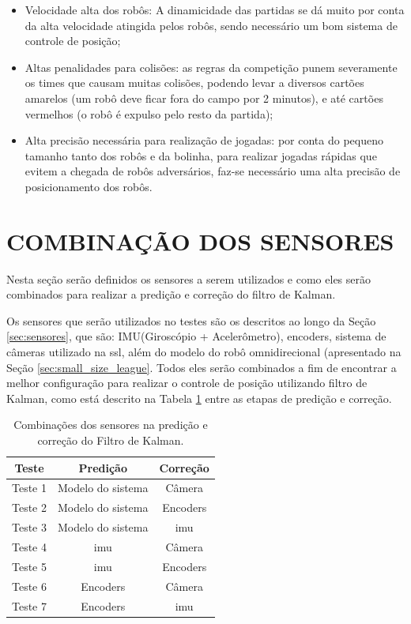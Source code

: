 \documentclass[acronym, symbols, table]{fei}
\begin{document}
		\begin{itemize}
			\item Velocidade alta dos robôs: A dinamicidade das partidas se dá muito por conta da alta velocidade atingida pelos robôs, sendo necessário um bom sistema de controle de posição;
			
			\item Altas penalidades para colisões: as regras da competição punem severamente os times que causam muitas colisões, podendo levar a diversos cartões amarelos (um robô deve ficar fora do campo por 2 minutos), e até cartões vermelhos (o robô é expulso pelo resto da partida);
			
			\item Alta precisão necessária para realização de jogadas: por conta do pequeno tamanho tanto dos robôs e da bolinha, para realizar jogadas rápidas que evitem a chegada de robôs adversários, faz-se necessário uma alta precisão de posicionamento dos robôs.
		\end{itemize}
		
	\section{COMBINAÇÃO DOS SENSORES}\label{sec_metodologia_comb_sensores}
	
		Nesta seção serão definidos os sensores a serem utilizados e como eles serão combinados para realizar a predição e correção do filtro de Kalman.
		
		Os sensores que serão utilizados no testes são os descritos ao longo da Seção \ref{sec:sensores}, que são: IMU(Giroscópio + Acelerômetro), encoders, sistema de câmeras utilizado na \acrshort{ssl}, além do modelo do robô omnidirecional (apresentado na Seção \ref{sec:small_size_league}. Todos eles serão combinados a fim de encontrar a melhor configuração para realizar o controle de posição utilizando filtro de Kalman, como está descrito na Tabela \ref{tbl:combinacao_sensores} entre as etapas de predição e correção.
		
		\begin{table}[!htb]
			\centering
			\caption{Combinações dos sensores na predição e correção do Filtro de Kalman.}
			\label{tbl:combinacao_sensores}
			\begin{tabular}{|c|c|c|}
				\hline
				\textbf{Teste}   & \textbf{Predição}   & \textbf{Correção} \\ \hline
				Teste 1 & Modelo do sistema & Câmera   \\ \hline
				Teste 2 & Modelo do sistema & Encoders \\ \hline
				Teste 3 & Modelo do sistema & \acrshort{imu} \\ \hline
				Teste 4 & \acrshort{imu}    & Câmera   \\ \hline
				Teste 5 & \acrshort{imu}    & Encoders \\ \hline
				Teste 6 & Encoders          & Câmera   \\ \hline
				Teste 7 & Encoders          & \acrshort{imu} \\ \hline
			\end{tabular}
		\end{table}
		
\end{document}
